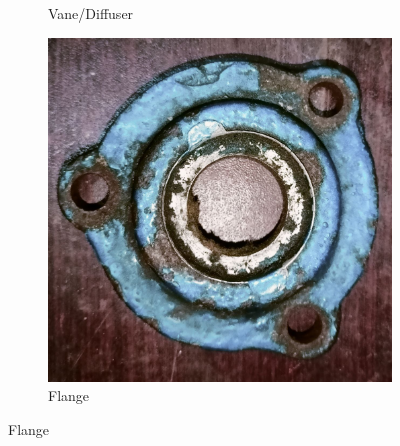 \documentclass[12pt]{article}
\begin{document}
\begin{figure}
\begin{subfigure}{0.3\textwidth}
      \caption{Vane/Diffuser}
  \end{subfigure}
  \hfill
  \begin{subfigure}{0.3\textwidth}
      \includegraphics[width=\linewidth]{img/p_06.jpg}
      \caption{Flange}
  \end{subfigure}

  \vspace{0.5cm}


\end{figure}
\end{document}
